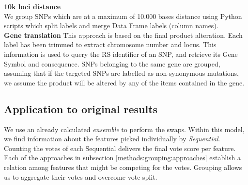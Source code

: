 \textbf{10k loci distance}\\
We group SNPs which are at a maximum of 10.000 bases distance using Python scripts which split labels and merge Data Frame labels (column names).
\\

\textbf{Gene translation}
This approach is based on the final product alteration. Each label has been trimmed to extract chromosome number and locus. This information is used to query the RS identifier of an SNP, and retrieve its Gene Symbol and consequence. SNPs belonging to the same gene are grouped, assuming that if the targeted SNPs are labelled as non-synonymous mutations, we assume the product will be altered by any of the items contained in the gene.

\subsection{Application to original results}
We use an already calculated \emph{ensemble} to perform the swaps. Within this model, we find information about the features picked individually by \emph{Sequential}. Counting the votes of each Sequential delivers the final vote score per feature.
\\

Each of the approaches in subsection \ref{methods:grouping:approaches} establish a relation among features that might be competing for the votes. Grouping allows us to aggregate their votes and overcome vote split.